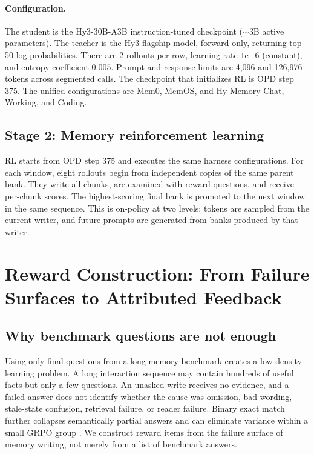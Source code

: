\documentclass{article}
\begin{document}
\paragraph{Configuration.}
The student is the Hy3-30B-A3B instruction-tuned checkpoint ($\sim$3B active parameters). The teacher is the Hy3 flagship model, forward only, returning top-50 log-probabilities. There are 2 rollouts per row, learning rate $1\mathrm{e}{-6}$ (constant), and entropy coefficient $0.005$. Prompt and response limits are 4{,}096 and 126{,}976 tokens across segmented calls. The checkpoint that initializes RL is OPD step 375. The unified configurations are Mem0, MemOS, and Hy-Memory Chat, Working, and Coding.

\subsection{Stage 2: Memory reinforcement learning}

RL starts from OPD step 375 and executes the same harness configurations. For each window, eight rollouts begin from independent copies of the same parent bank. They write all chunks, are examined with reward questions, and receive per-chunk scores. The highest-scoring final bank is promoted to the next window in the same sequence. This is on-policy at two levels: tokens are sampled from the current writer, and future prompts are generated from banks produced by that writer.

\section{Reward Construction: From Failure Surfaces to Attributed Feedback}

\subsection{Why benchmark questions are not enough}

Using only final questions from a long-memory benchmark creates a low-density learning problem. A long interaction sequence may contain hundreds of useful facts but only a few questions. An unasked write receives no evidence, and a failed answer does not identify whether the cause was omission, bad wording, stale-state confusion, retrieval failure, or reader failure. Binary exact match further collapses semantically partial answers and can eliminate variance within a small GRPO group \citep{he2026}. We construct reward items from the failure surface of memory writing, not merely from a list of benchmark answers.
\end{document}
